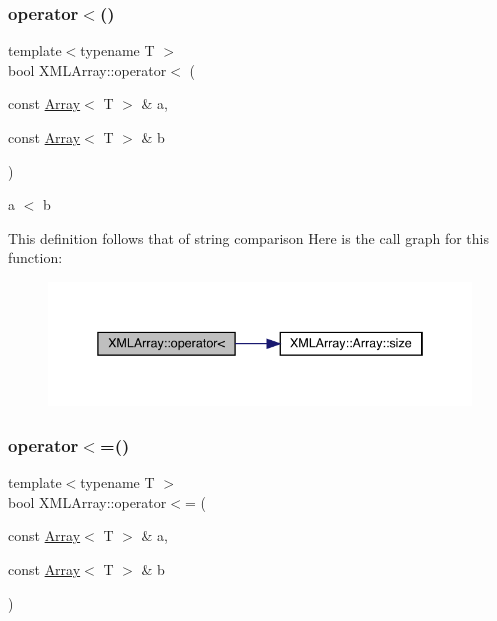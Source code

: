 \subsubsection{\texorpdfstring{operator$<$()}{operator<()}}
{\footnotesize\ttfamily template$<$typename T $>$ \\
bool X\+M\+L\+Array\+::operator$<$ (\begin{DoxyParamCaption}\item[{const \mbox{\hyperlink{classXMLArray_1_1Array}{Array}}$<$ T $>$ \&}]{a,  }\item[{const \mbox{\hyperlink{classXMLArray_1_1Array}{Array}}$<$ T $>$ \&}]{b }\end{DoxyParamCaption})\hspace{0.3cm}{\ttfamily [inline]}}



a $<$ b 

This definition follows that of string comparison Here is the call graph for this function\+:\nopagebreak
\begin{figure}[H]
\begin{center}
\leavevmode
\includegraphics[width=338pt]{dd/db1/namespaceXMLArray_a6cdc9d50a3fbbd96cfbbef4bbaf78fa4_cgraph}
\end{center}
\end{figure}
\mbox{\label{namespaceXMLArray_a874058edffc8dde49083322f99229c95}} 
\subsubsection{\texorpdfstring{operator$<$=()}{operator<=()}}
{\footnotesize\ttfamily template$<$typename T $>$ \\
bool X\+M\+L\+Array\+::operator$<$= (\begin{DoxyParamCaption}\item[{const \mbox{\hyperlink{classXMLArray_1_1Array}{Array}}$<$ T $>$ \&}]{a,  }\item[{const \mbox{\hyperlink{classXMLArray_1_1Array}{Array}}$<$ T $>$ \&}]{b }\end{DoxyParamCaption})\hspace{0.3cm}{\ttfamily [inline]}}



